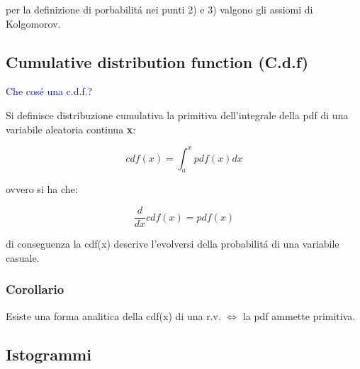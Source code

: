  \noindent per la definizione di porbabilit\'{a} nei punti 2) e 3) valgono gli assiomi di Kolgomorov.
 
 
\begin{figure}[!ht]
	\vspace{0.2in}
    \centering
    \qquad
\end{figure}

\subsection{Cumulative distribution function (C.d.f)}

\textcolor{blue}{Che cos\'{e} una c.d.f.?} \newline

Si definisce distribuzione cumulativa la primitiva dell'integrale della pdf di una variabile aleatoria continua \textbf{x}:

\begin{equation}
	cdf(x) = \int_{a}^{x}{pdf(x)dx}
\end{equation}

\noindent ovvero si ha che:

\begin{equation}
	\dfrac{d}{dx}cdf(x)  = pdf(x)
\end{equation}

di conseguenza la cdf(x) descrive l'evolversi della probabilit\'{a} di una variabile casuale.

\subsubsection{Corollario}

Esiste una forma analitica della cdf(x) di una r.v. $\iff$ la pdf ammette primitiva. 

\begin{figure}[!ht]
	\vspace{0.2in}
    \centering
    \qquad
\end{figure}

\subsection{Istogrammi}


